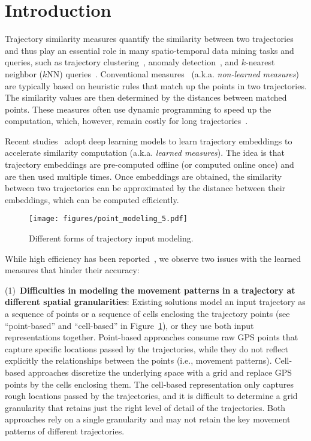 \section{Introduction}\label{sec:introduction}


Trajectory similarity measures quantify the similarity between two trajectories and thus play an essential role in many spatio-temporal data mining tasks and queries, such as trajectory clustering~\cite{edr,representative_traj}, anomaly detection~\cite{laxhammar2013online,liu2020online}, and $k$-nearest neighbor ($k$NN) queries~\cite{dita,torch}. 
Conventional measures~\cite{dfrechet,edr,edwp} (a.k.a. \emph{non-learned measures}) are typically based on heuristic rules that match up the points in two trajectories. The similarity values are then determined by the distances between matched points. 
These measures often use dynamic programming to speed up the computation, which, however, remain costly for long trajectories~\cite{trajsimi_survey}.

Recent studies~\cite{neutraj,gts,t3s,st2vec,trajgat,trajcl,kgts} adopt deep learning models to learn trajectory embeddings to accelerate similarity computation (a.k.a. \emph{learned measures}).
The idea is that trajectory embeddings are pre-computed offline (or computed online once)  and are then used multiple times. Once embeddings are obtained, the similarity between two trajectories can be approximated by the distance between their embeddings, which can be computed efficiently. 


\begin{figure}[ht]
    \centering
    \hspace*{-1mm}
    \vspace{-3mm}
    \texttt{[image: figures/point\_modeling\_5.pdf]}
    \vspace{-3mm}
    \caption{Different forms of trajectory input modeling.}\label{fig:point_modeling}
    \vspace{-2mm}
\end{figure}

While high efficiency has  been reported~\cite{t3s,tmn,trajcl}, we observe two issues with the learned measures that hinder their accuracy:

(1)~\textbf{Difficulties in modeling the movement patterns in a trajectory at different spatial granularities}: 
Existing solutions model an input trajectory as a sequence of points or a sequence of cells enclosing the trajectory points (see ``point-based'' and ``cell-based'' in Figure~\ref{fig:point_modeling}), or they use both input representations together. 
Point-based approaches consume raw GPS points that capture specific locations passed by the trajectories, while they do not reflect  explicitly the relationships between the points (i.e., movement patterns). 
Cell-based approaches discretize the underlying space with a grid and replace GPS points by the cells enclosing them. The cell-based representation only captures rough locations passed by the trajectories, and it is difficult to determine a grid granularity that retains just the right level of detail of the trajectories. 
Both approaches rely on a single granularity and may not retain the key movement patterns of different trajectories.


